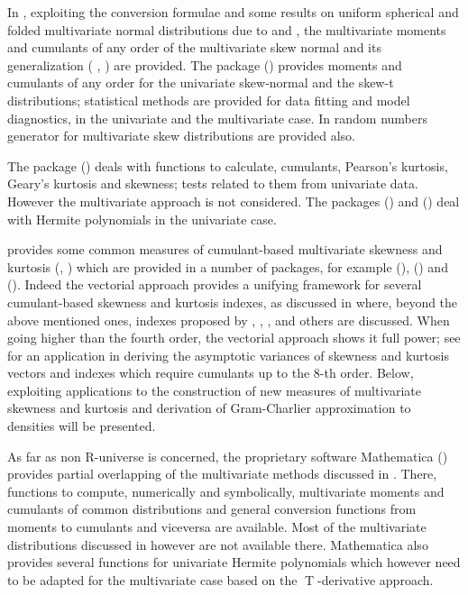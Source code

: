 In , exploiting the conversion formulae and some results on uniform spherical and folded multivariate normal distributions due to \citet{jamma2021San} and \citet{terdik2021multivariate}, the multivariate moments and cumulants of any order of the multivariate skew normal and its generalization (\citet{azzalini1996multivariate} , \citet{arellano2005fundamental}) are provided. The package  (\citet{Azza22}) provides moments and cumulants of any order for the univariate skew-normal and the skew-t distributions; statistical methods are provided for data fitting and model diagnostics, in the univariate and the multivariate case. In  random numbers generator for multivariate skew distributions are provided also.

The package  (\citet{Komsta22}) deals with functions to calculate, cumulants, Pearson's kurtosis, Geary's kurtosis and skewness; tests related to them from univariate data. However the multivariate approach is not considered. The packages  (\citet{khale13}) and  (\citet{Novom22}) deal with Hermite polynomials in the univariate case.

 provides some common measures of cumulant-based multivariate skewness and kurtosis (\citet{Mardia70}, \citet{mori1994multivariate}) which are provided in a number of packages, for example  (\citet{LoperfidoMax}),  (\citet{LoperfidoMus}) and  (\citet{loperfido21}). Indeed the vectorial approach provides a unifying framework for several cumulant-based skewness and kurtosis indexes, as discussed in \citet{jamma2021San} where, beyond the above mentioned ones, indexes proposed by \citet{malkovich1973}, \citet{kollo2008multivariate}, \citet{koziol1987}, \citet{koziol1989} and others are discussed. When going higher than the fourth order, the vectorial approach shows it full power; see \citet{jamma2021SJS} for an application in deriving the asymptotic variances of skewness and kurtosis vectors and indexes which require cumulants up to the \(8\)-th order. Below, exploiting  applications to the construction of new measures of multivariate skewness and kurtosis and derivation of Gram-Charlier approximation to densities will be presented.

As far as non R-universe is concerned, the proprietary software Mathematica (\citet{Mathematica}) provides partial overlapping of the multivariate methods discussed in . There, functions to compute, numerically and symbolically, multivariate moments and cumulants of common distributions and general conversion functions from moments to cumulants and viceversa are available. Most of the multivariate distributions discussed in  however are not available there. Mathematica also provides several functions for univariate Hermite polynomials which however need to be adapted for the multivariate case based on the \(\operatorname{T}\)-derivative approach.

